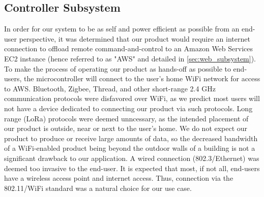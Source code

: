 \subsection{Controller Subsystem}
\label{sec:controller_subsystem}
In order for our system to be as self and power efficient as
possible from an end-user perspective, it was determined that our product
would require an internet connection to offload remote command-and-control
to an Amazon Web Services EC2 instance (hence referred to as "AWS" and detailed in
\autoref{sec:web_subsystem}). To make the process of operating our product 
as hands-off as possible to end-users, the microcontroller will connect to
the user's home WiFi network for access to AWS. Bluetooth, Zigbee, Thread,
and other short-range 2.4 GHz communication protocols were disfavored over
WiFi, as we predict most users will not have a device dedicated to
connecting our product via such protocols. Long range (LoRa) protocols were
deemed unncessary, as the intended placement of our product is outside, 
near or next to the user's home. We do not expect our product to produce
or receive large amounts of data, so the decreased bandwidth of a
WiFi-enabled product being beyond the outdoor walls of a building
is not a significant drawback to our application. A wired connection
(802.3/Ethernet) was deemed too invasive to the end-user. It is expected
that most, if not all, end-users have a wireless access point and internet
access. Thus, connection via the 802.11/WiFi standard was a natural choice
for our use case.

